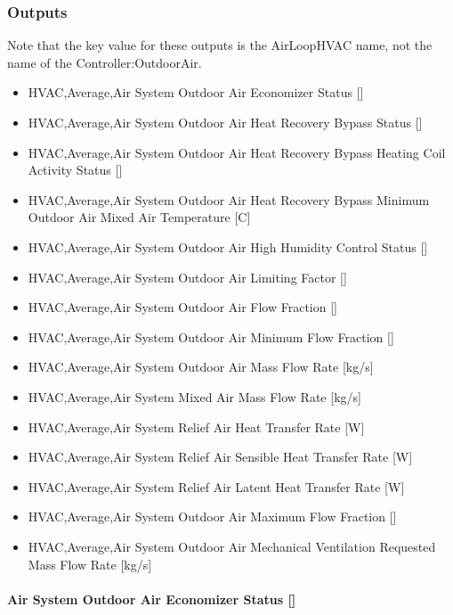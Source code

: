 \subsubsection{Outputs}\label{outputs-005}

Note that the key value for these outputs is the AirLoopHVAC name, not the name of the Controller:OutdoorAir.

\begin{itemize}
\item
  HVAC,Average,Air System Outdoor Air Economizer Status {[]}
\item
  HVAC,Average,Air System Outdoor Air Heat Recovery Bypass Status {[]}
\item
  HVAC,Average,Air System Outdoor Air Heat Recovery Bypass Heating Coil Activity Status {[]}
\item
  HVAC,Average,Air System Outdoor Air Heat Recovery Bypass Minimum Outdoor Air Mixed Air Temperature {[}C{]}
\item
  HVAC,Average,Air System Outdoor Air High Humidity Control Status {[]}
\item
  HVAC,Average,Air System Outdoor Air Limiting Factor {[]}
\item
  HVAC,Average,Air System Outdoor Air Flow Fraction {[]}
\item
  HVAC,Average,Air System Outdoor Air Minimum Flow Fraction {[]}
\item
  HVAC,Average,Air System Outdoor Air Mass Flow Rate {[}kg/s{]}
\item
  HVAC,Average,Air System Mixed Air Mass Flow Rate {[}kg/s{]}
\item
  HVAC,Average,Air System Relief Air Heat Transfer Rate {[}W{]}
\item
  HVAC,Average,Air System Relief Air Sensible Heat Transfer Rate {[}W{]}
\item
  HVAC,Average,Air System Relief Air Latent Heat Transfer Rate {[}W{]}
\item
  HVAC,Average,Air System Outdoor Air Maximum Flow Fraction {[]}
\item
  HVAC,Average,Air System Outdoor Air Mechanical Ventilation Requested Mass Flow Rate {[}kg/s{]}
\end{itemize}

\paragraph{Air System Outdoor Air Economizer Status {[]}}\label{air-system-outdoor-air-economizer-status}

